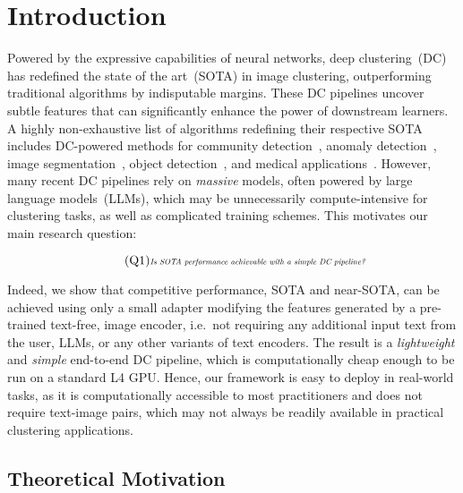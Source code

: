 \section{Introduction}
Powered by the expressive capabilities of neural networks, deep clustering~(DC) has redefined the state of the art~(SOTA) in image clustering, outperforming traditional algorithms by indisputable margins. These DC pipelines uncover subtle features that can significantly enhance the power of downstream learners. A highly non-exhaustive list of algorithms redefining their respective SOTA includes DC-powered methods for community detection~\cite{saeedi2018novel, yaroslavtsev2018massively}, anomaly detection~\cite{pang2021deep}, image segmentation~\cite{minaee2021image, liang2023clustsegclusteringuniversalsegmentation}, object detection~\cite{zhao2019object, kim2024garfieldgroupradiancefields}, and medical applications~\cite{zhao2020joint}. However, many recent DC pipelines rely on \textit{massive} models, often powered by large language models~(LLMs), which may be unnecessarily compute-intensive for clustering tasks, as well as complicated training schemes. This motivates our main research question: 

\begin{equation}
\label{Q1}
\tag{Q1}
\resizebox{0.5\hsize}{!}{$
    \mbox{\textit{Is SOTA performance achievable with a simple DC pipeline?}}
$}
\end{equation}

Indeed, we show that competitive performance, SOTA and near-SOTA, can be achieved using only a small adapter modifying the features generated by a pre-trained text-free, image encoder, i.e.\ not requiring any additional input text from the user, LLMs, or any other variants of text encoders.  The result is a \textit{lightweight} and \textit{simple} end-to-end DC pipeline, which is computationally cheap enough to be run on a standard L4 GPU. Hence, our framework is easy to deploy in real-world tasks, as it is computationally accessible to most practitioners and does not require text-image pairs, which may not always be readily available in practical clustering applications.

\subsection{Theoretical Motivation}

